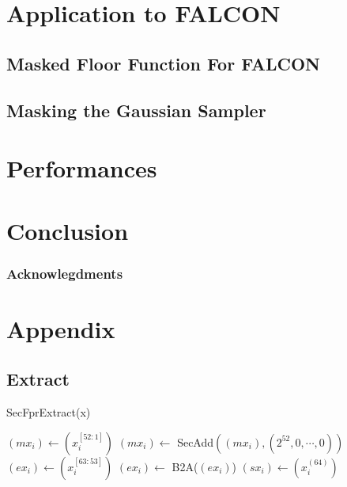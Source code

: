 \documentclass[runningheads]{llncs}
\begin{document}
\section{Application to FALCON}\label{sec:appfalcon}
\subsection{Masked Floor Function For FALCON}
\subsection{Masking the Gaussian Sampler}
\section{Performances}\label{sec:perf}



\section{Conclusion}\label{sec:conclusion}
\subsubsection{Acknowlegdments}

%
%
%

\newpage


 
 

\newpage

\section*{Appendix}


\subsection*{Extract}

\begin{algorithm}
  \caption{SecFprExtract(x)}
  \label{algo:SecFprExtract }
  $(mx_i) \leftarrow (x_i^{[52:1]})$\;
  $(mx_i) \leftarrow$ SecAdd$((mx_i), (2^{52}, 0, \cdots, 0))$ 
  $(ex_i) \leftarrow (x_i^{[63:53]})$\;
  $(ex_i) \leftarrow$ B2A($(ex_i)$)\;
  $(sx_i) \leftarrow (x_i^{(64)})$\;
\;
\end{algorithm}
\end{document}
